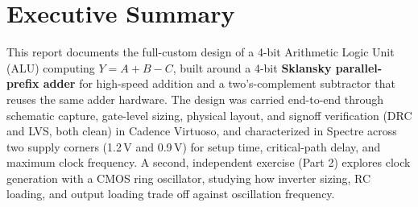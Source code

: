 \documentclass[11pt, a4paper]{article}
\begin{document}
\section*{Executive Summary}

This report documents the full-custom design of a 4-bit Arithmetic Logic Unit
(ALU) computing $Y = A + B - C$, built around a 4-bit \textbf{Sklansky
parallel-prefix adder} for high-speed addition and a two's-complement
subtractor that reuses the same adder hardware. The design was carried
end-to-end through schematic capture, gate-level sizing, physical layout,
and signoff verification (DRC and LVS, both clean) in Cadence Virtuoso, and
characterized in Spectre across two supply corners (1.2\,V and 0.9\,V) for
setup time, critical-path delay, and maximum clock frequency. A second,
independent exercise (Part 2) explores clock generation with a CMOS ring
oscillator, studying how inverter sizing, RC loading, and output loading
trade off against oscillation frequency.

\medskip
\begin{center}
\end{center}
\end{document}
